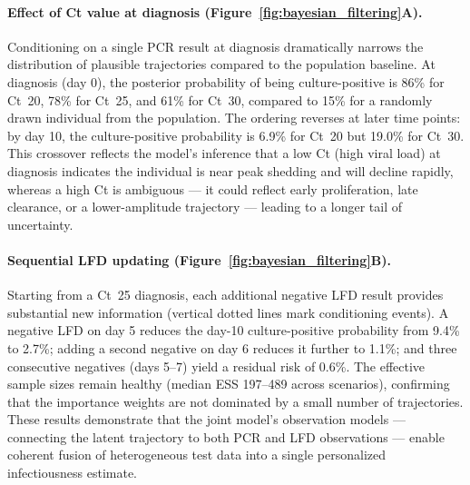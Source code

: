 \documentclass[12pt]{article}
\begin{document}
\paragraph{Effect of Ct value at diagnosis (Figure~\ref{fig:bayesian_filtering}A).} Conditioning on a single PCR result at diagnosis dramatically narrows the distribution of plausible trajectories compared to the population baseline. At diagnosis (day 0), the posterior probability of being culture-positive is 86\% for Ct~20, 78\% for Ct~25, and 61\% for Ct~30, compared to 15\% for a randomly drawn individual from the population. The ordering reverses at later time points: by day 10, the culture-positive probability is 6.9\% for Ct~20 but 19.0\% for Ct~30. This crossover reflects the model's inference that a low Ct (high viral load) at diagnosis indicates the individual is near peak shedding and will decline rapidly, whereas a high Ct is ambiguous --- it could reflect early proliferation, late clearance, or a lower-amplitude trajectory --- leading to a longer tail of uncertainty.

\paragraph{Sequential LFD updating (Figure~\ref{fig:bayesian_filtering}B).} Starting from a Ct~25 diagnosis, each additional negative LFD result provides substantial new information (vertical dotted lines mark conditioning events). A negative LFD on day 5 reduces the day-10 culture-positive probability from 9.4\% to 2.7\%; adding a second negative on day 6 reduces it further to 1.1\%; and three consecutive negatives (days 5--7) yield a residual risk of 0.6\%. The effective sample sizes remain healthy (median ESS 197--489 across scenarios), confirming that the importance weights are not dominated by a small number of trajectories. These results demonstrate that the joint model's observation models --- connecting the latent trajectory to both PCR and LFD observations --- enable coherent fusion of heterogeneous test data into a single personalized infectiousness estimate.
\end{document}

